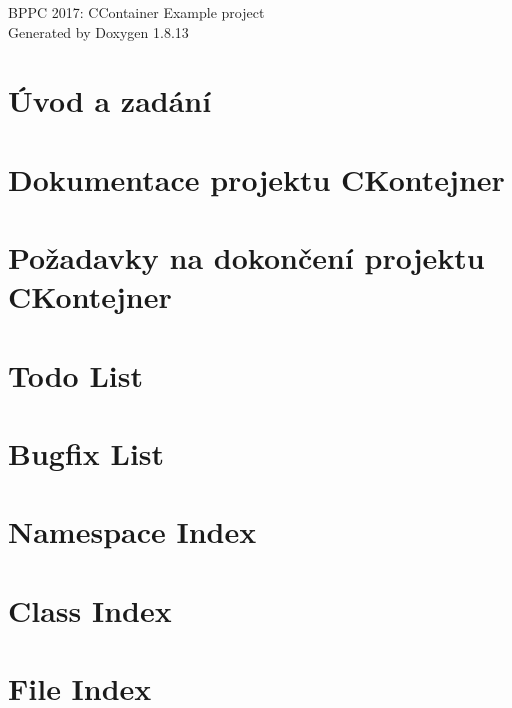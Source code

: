 \documentclass[twoside]{book}
\newcommand{\+}{\discretionary{\mbox{\scriptsize$\hookleftarrow$}}{}{}}
\newcommand{\clearemptydoublepage}{%
  \newpage{\pagestyle{empty}\cleardoublepage}%
}
\begin{document}
\hypersetup{pageanchor=false,
             bookmarksnumbered=true,
             pdfencoding=unicode
            }
\begin{titlepage}
\vspace*{7cm}
\begin{center}%
{\Large B\+P\+PC 2017\+: C\+Container Example project }\\
\vspace*{1cm}
{\large Generated by Doxygen 1.8.13}\\
\end{center}
\end{titlepage}
\clearemptydoublepage
{}
\tableofcontents
\clearemptydoublepage
{}
\hypersetup{pageanchor=true}

\chapter{Úvod a zadání}
\label{index}\hypertarget{index}{}
\chapter{Dokumentace projektu C\+Kontejner}
\label{doc}

\chapter{Požadavky na dokončení projektu C\+Kontejner}
\label{_tasks}

\chapter{Todo List}
\label{todo}

\chapter{Bugfix List}
\label{bugfix}

\chapter{Namespace Index}

\chapter{Class Index}

\chapter{File Index}

\end{document}
